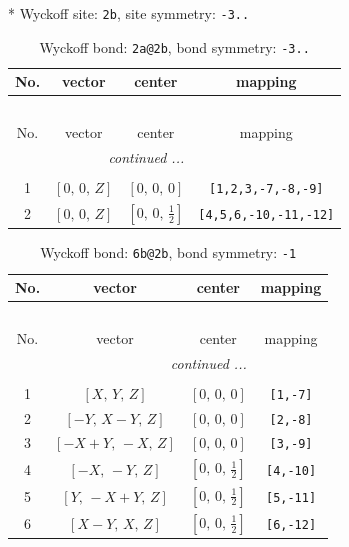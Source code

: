 \documentclass[fleqn,8pt]{jsarticle}
\begin{document}
* Wyckoff site: {\tt 2b}, site symmetry: {\tt -3..}
\renewcommand{\arraystretch}{1.2}
\begin{longtable}{cccc}
\caption{Wyckoff bond: {\tt 2a@2b}, bond symmetry: {\tt -3..}}
 \\
 \hline \hline
No. & vector & center & mapping \\ \hline \endfirsthead

\multicolumn{3}{l}{\tablename\ \thetable{}} \\
 \hline \hline
No. & vector & center & mapping \\ \hline \endhead

 \hline \hline
\multicolumn{3}{r}{\footnotesize\it continued ...} \\ \endfoot

 \hline \hline
\multicolumn{3}{r}{} \\ \endlastfoot

1 & $\left[ 0,\, 0,\, Z \right]$ & $\left[ 0,\, 0,\, 0 \right]$ & {\tt [1,2,3,-7,-8,-9]} \\ \hline
2 & $\left[ 0,\, 0,\, Z \right]$ & $\left[ 0,\, 0,\, \frac{1}{2} \right]$ & {\tt [4,5,6,-10,-11,-12]} \\
\end{longtable}
\renewcommand{\arraystretch}{1.2}
\begin{longtable}{cccc}
\caption{Wyckoff bond: {\tt 6b@2b}, bond symmetry: {\tt -1}}
 \\
 \hline \hline
No. & vector & center & mapping \\ \hline \endfirsthead

\multicolumn{3}{l}{\tablename\ \thetable{}} \\
 \hline \hline
No. & vector & center & mapping \\ \hline \endhead

 \hline \hline
\multicolumn{3}{r}{\footnotesize\it continued ...} \\ \endfoot

 \hline \hline
\multicolumn{3}{r}{} \\ \endlastfoot

1 & $\left[ X,\, Y,\, Z \right]$ & $\left[ 0,\, 0,\, 0 \right]$ & {\tt [1,-7]} \\ \hline
2 & $\left[ - Y,\, X - Y,\, Z \right]$ & $\left[ 0,\, 0,\, 0 \right]$ & {\tt [2,-8]} \\ \hline
3 & $\left[ - X + Y,\, - X,\, Z \right]$ & $\left[ 0,\, 0,\, 0 \right]$ & {\tt [3,-9]} \\ \hline
4 & $\left[ - X,\, - Y,\, Z \right]$ & $\left[ 0,\, 0,\, \frac{1}{2} \right]$ & {\tt [4,-10]} \\ \hline
5 & $\left[ Y,\, - X + Y,\, Z \right]$ & $\left[ 0,\, 0,\, \frac{1}{2} \right]$ & {\tt [5,-11]} \\ \hline
6 & $\left[ X - Y,\, X,\, Z \right]$ & $\left[ 0,\, 0,\, \frac{1}{2} \right]$ & {\tt [6,-12]} \\
\end{longtable}
\end{document}
